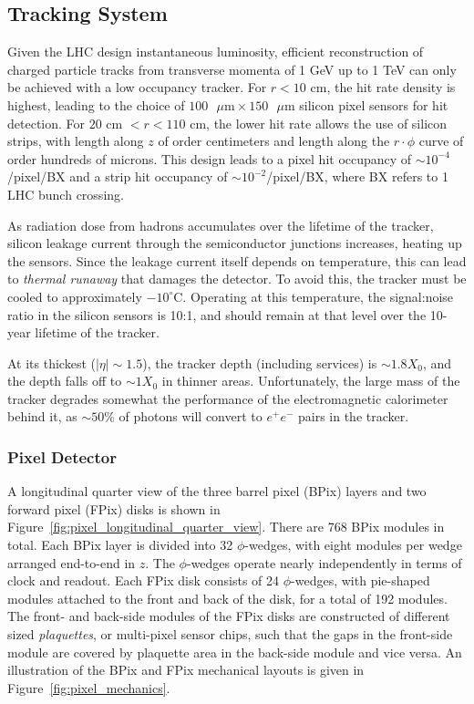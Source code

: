 \documentclass[dissertation.tex]{subfiles}
\begin{document}
\subsection{Tracking System}
\label{sec:Tracking System}

Given the LHC design instantaneous luminosity, efficient reconstruction of charged particle tracks from transverse momenta of 1 GeV up to 1 TeV can only be achieved with a low occupancy tracker.  For $r < 10$ cm, the hit rate density is highest, leading to the choice of $100\mbox{ }\mu\mbox{m} \times 150\mbox{ }\mu\mbox{m}$ silicon pixel sensors for hit detection.  For $20\mbox{ cm }< r < 110\mbox{ cm}$, the lower hit rate allows the use of silicon strips, with length along $z$ of order centimeters and length along the $r\cdot\phi$ curve of order hundreds of microns.  This design leads to a pixel hit occupancy of $\sim10^{-4}$/pixel/BX and a strip hit occupancy of $\sim10^{-2}$/pixel/BX, where BX refers to 1 LHC bunch crossing.

As radiation dose from hadrons accumulates over the lifetime of the tracker, silicon leakage current through the semiconductor junctions increases, heating up the sensors.  Since the leakage current itself depends on temperature, this can lead to \textit{thermal runaway} that damages the detector.  To avoid this, the tracker must be cooled to approximately $-10^{\circ}$C.  Operating at this temperature, the signal:noise ratio in the silicon sensors is 10:1, and should remain at that level over the 10-year lifetime of the tracker.

At its thickest ($|\eta|\sim1.5$), the tracker depth (including services) is $\sim1.8X_{0}$, and the depth falls off to $\sim1X_{0}$ in thinner areas.  Unfortunately, the large mass of the tracker degrades somewhat the performance of the electromagnetic calorimeter behind it, as $\sim50$\% of photons will convert to $e^{+}e^{-}$ pairs in the tracker.

\subsubsection{Pixel Detector}
\label{sec:Pixel Detector}

A longitudinal quarter view of the three barrel pixel (BPix) layers and two forward pixel (FPix) disks is shown in Figure~\ref{fig:pixel_longitudinal_quarter_view}.  There are 768 BPix modules in total.  Each BPix layer is divided into 32 $\phi$-wedges, with eight modules per wedge arranged end-to-end in $z$.  The $\phi$-wedges operate nearly independently in terms of clock and readout.  Each FPix disk consists of 24 $\phi$-wedges, with pie-shaped modules attached to the front and back of the disk, for a total of 192 modules.  The front- and back-side modules of the FPix disks are constructed of different sized \textit{plaquettes}, or multi-pixel sensor chips, such that the gaps in the front-side module are covered by plaquette area in the back-side module and vice versa.  An illustration of the BPix and FPix mechanical layouts is given in Figure~\ref{fig:pixel_mechanics}.
\end{document}
